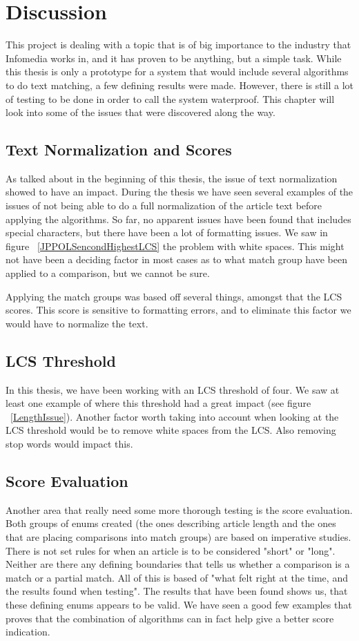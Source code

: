 \chapter{Discussion}

This project is dealing with a topic that is of big importance to the industry that Infomedia works in, and it has proven to be anything, but a simple task. While this thesis is only a prototype for a system that would include several algorithms to do text matching, a few defining results were made. However, there is still a lot of testing to be done in order to call the system waterproof. This chapter will look into some of the issues that were discovered along the way.

\section{Text Normalization and Scores}
As talked about in the beginning of this thesis, the issue of text normalization showed to have an impact. During the thesis we have seen several examples of the issues of not being able to do a full normalization of the article text before applying the algorithms. So far, no apparent issues have been found that includes special characters, but there have been a lot of formatting issues. We saw in figure ~\ref{JPPOLSencondHighestLCS} the problem with white spaces. This might not have been a deciding factor in most cases as to what match group have been applied to a comparison, but we cannot be sure.

Applying the match groups was based off several things, amongst that the LCS scores. This score is sensitive to formatting errors, and to eliminate this factor we would have to normalize the text.

\section{LCS Threshold}
In this thesis, we have been working with an LCS threshold of four. We saw at least one example of where this threshold had a great impact (see figure ~\ref{LengthIssue}). Another factor worth taking into account when looking at the LCS threshold would be to remove white spaces from the LCS. Also removing stop words would impact this.

\section{Score Evaluation}
Another area that really need some more thorough testing is the score evaluation. Both groups of enums created (the ones describing article length and the ones that are placing comparisons into match groups) are based on imperative studies. There is not set rules for when an article is to be considered "short" or "long". Neither are there any defining boundaries that tells us whether a comparison is a match or a partial match. All of this is based of "what felt right at the time, and the results found when testing". The results that have been found shows us, that these defining enums appears to be valid. We have seen a good few examples that proves that the combination of algorithms can in fact help give a better score indication. 

